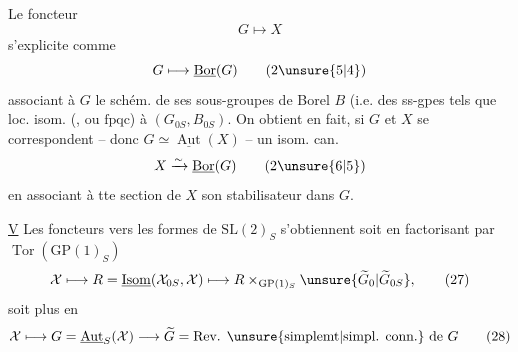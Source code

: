 Le foncteur
\[
G\longmapsto X
\]
s'explicite comme
\[
G\longmapsto\underline{\operatorname{Bor}}(G)\tag*{(2\unsure{5|4})}
\]
associant à $G$ le  schém. de ses sous-groupes de Borel $B$ (i.e.  des ss-gpes tels que    loc. isom.  (, ou $\mathrm{fpqc}$) à  $(G_{0S},B_{0S})$. On obtient en fait, si $G$ et $X$ se correspondent -- donc $G\simeq\underline{\operatorname{Aut}}(X)$ -- un isom. can.
\[
X\xrightarrow{\sim}\underline{\operatorname{Bor}}(G)\tag*{(2\unsure{6|5})}
\]
en associant à tte section  de $X$ son stabilisateur dans $G$.

\uline{V} Les foncteurs vers les formes de $\mathrm{SL}(2)_S$ s'obtiennent soit en factorisant par $\operatorname{Tor}(\mathrm{GP}(1)_S)$
\[
\mathcal X\longmapsto R=\underline{\operatorname{Isom}}(\mathcal X_{0S},\mathcal X)\longmapsto R\times_{\mathrm{GP}(1)_S}\unsure{\widetilde G_0|\widetilde G_{0S}},\tag*{(27)}
\]
soit plus  en
\[
\mathcal X\longmapsto G=\underline{\operatorname{Aut}}_S(\mathcal X)\longrightarrow\widetilde G=\text{Rev. \unsure{simplemt|simpl. conn.} de $G$}\tag*{(28)}
\]
